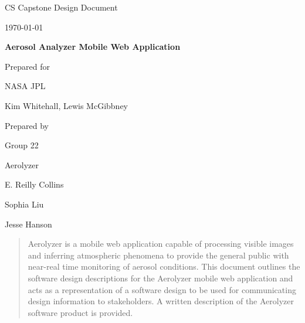 \documentclass[onecolumn, draftclsnofoot,10pt, compsoc]{IEEEtran}
\def \CapstoneTeamName{		Aerolyzer}
\def \CapstoneTeamNumber{		22}
\def \GroupMemberOne{			E. Reilly Collins}
\def \GroupMemberTwo{			Sophia Liu}
\def \GroupMemberThree{			Jesse Hanson}
\def \CapstoneProjectName{		Aerosol Analyzer Mobile Web Application}
\def \CapstoneSponsorCompany{	NASA JPL}
\def \CapstoneSponsorPerson{		Kim Whitehall, Lewis McGibbney}
\def \DocType{		%
				Design Document
				}
\newcommand{\NameSigPair}[1]{\par
\makebox[2.75in][r]{#1} \hfil 	\makebox[3.25in]{\makebox[2.25in]{\hrulefill} \hfill		\makebox[.75in]{\hrulefill}}
\par\vspace{-12pt} \textit{\tiny\noindent
\makebox[2.75in]{} \hfil		\makebox[3.25in]{\makebox[2.25in][r]{Signature} \hfill	\makebox[.75in][r]{Date}}}}
\renewcommand{\NameSigPair}[1]{#1}
\begin{document}
\begin{flushleft}
\begin{titlepage}
    \begin{singlespace}
        \hfill 
        \par\vspace{.2in}
        \centering
        \scshape{
            \huge CS Capstone \DocType \par
            {\large\today}\par
            \vspace{.5in}
            \textbf{\Huge\CapstoneProjectName}\par
            \vfill
            {\large Prepared for}\par
            \Huge \CapstoneSponsorCompany\par
            \vspace{5pt}
            {\Large\NameSigPair{\CapstoneSponsorPerson}\par}
            {\large Prepared by }\par
            Group\CapstoneTeamNumber\par
            \CapstoneTeamName\par 
            \vspace{5pt}
            {\Large
                \NameSigPair{\GroupMemberOne}\par
                \NameSigPair{\GroupMemberTwo}\par
                \NameSigPair{\GroupMemberThree}\par
            }
            \vspace{20pt}
        }
        \begin{abstract}
        	Aerolyzer is a mobile web application capable of processing visible images and inferring atmospheric phenomena to provide the general public with near-real time monitoring of aerosol conditions. 
            This document outlines the software design descriptions for the Aerolyzer mobile web application and acts as a representation of a software design to be used for communicating design information to stakeholders. 
            A written description of the Aerolyzer software product is provided. 
        \end{abstract}     
    \end{singlespace}
\end{titlepage}
\newpage
{}
\tableofcontents
\clearpage
\listoffigures
\listoftables
\clearpage


\end{flushleft}
\end{document}
